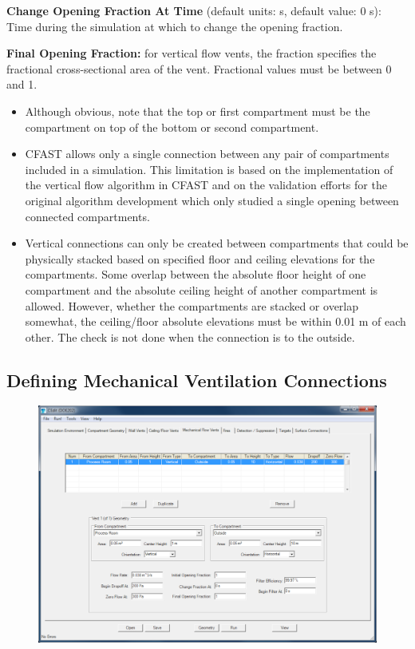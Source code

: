 \textbf{Change Opening Fraction At Time} (default units: s, default value: 0 s): Time during the simulation at which to change the opening fraction.

\textbf{Final Opening Fraction:} for vertical flow vents, the fraction specifies the fractional cross-sectional area of the vent. Fractional values must be between 0 and 1.

\begin{itemize}
\item Although obvious, note that the top or first compartment must be the compartment on top of the bottom or second compartment.
\item CFAST allows only a single connection between any pair of compartments included in a simulation. This limitation is based on the implementation of the vertical flow algorithm in CFAST and on the validation efforts for the original algorithm development  which only studied a single opening between connected compartments.
\item Vertical connections can only be created between compartments that could be physically stacked based on specified floor and ceiling elevations for the compartments.  Some overlap between the absolute floor height of one compartment and the absolute ceiling height of another compartment is allowed.  However, whether the compartments are stacked or overlap somewhat, the ceiling/floor absolute elevations must be within 0.01 m of each other. The check is not done when the connection is to the outside.
\end{itemize}

\subsection{Defining Mechanical Ventilation Connections}

\begin{figure}[h!]
\begin{center}
\includegraphics[width=6.5in]{FIGURES/Input_File/Mechanical_Vent_Tab}
\end{center}
\end{figure}

